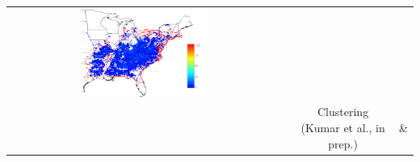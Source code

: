 \begin{frame}
\begin{tabular}{c c c c}
  \includegraphics[width=0.47\textwidth]{tree_ranges_figures/Cornus_florida_interpolatedIV_1_cropped.png} \\
   & & Clustering (Kumar et al., in prep.) & \citet{Prasad_Ecosystems_20060301} \& \citet{Iverson_ForestEcolManag_20080210} \\
 \end{tabular}
\end{frame}
